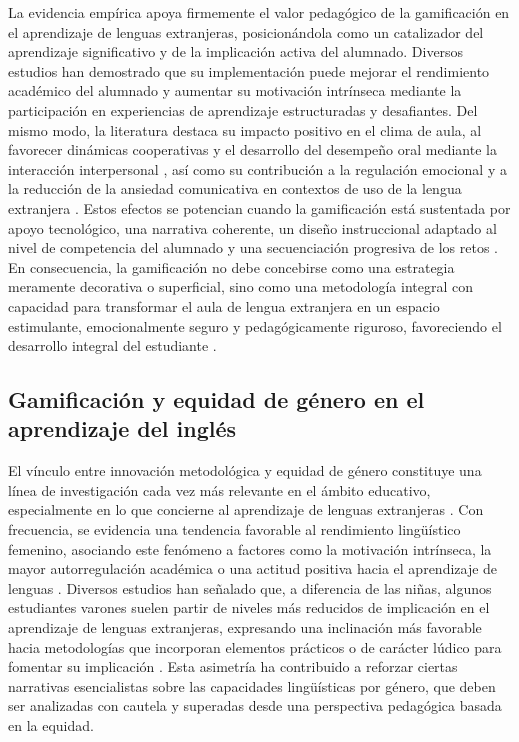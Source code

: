\documentclass[spanish]{textolivre}
\begin{document}
La evidencia empírica apoya firmemente el valor pedagógico de la gamificación en el aprendizaje de lenguas extranjeras, posicionándola como un catalizador del aprendizaje significativo y de la implicación activa del alumnado. Diversos estudios han demostrado que su implementación puede mejorar el rendimiento académico del alumnado \cite{sanchez2019, fiestas2023} y aumentar su motivación intrínseca \cite{lampropoulos2022} mediante la participación en experiencias de aprendizaje estructuradas y desafiantes. Del mismo modo, la literatura destaca su impacto positivo en el clima de aula, al favorecer dinámicas cooperativas y el desarrollo del desempeño oral mediante la interacción interpersonal \cite{wong2021}, así como su contribución a la regulación emocional y a la reducción de la ansiedad comunicativa en contextos de uso de la lengua extranjera \cite{mora2020}. Estos efectos se potencian cuando la gamificación está sustentada por apoyo tecnológico, una narrativa coherente, un diseño instruccional adaptado al nivel de competencia del alumnado y una secuenciación progresiva de los retos \cite{quintero2018}. En consecuencia, la gamificación no debe concebirse como una estrategia meramente decorativa o superficial, sino como una metodología integral con capacidad para transformar el aula de lengua extranjera en un espacio estimulante, emocionalmente seguro y pedagógicamente riguroso, favoreciendo el desarrollo integral del estudiante \cite{garcia2021}.

\subsection{Gamificación y equidad de género en el aprendizaje del inglés}
El vínculo entre innovación metodológica y equidad de género constituye una línea de investigación cada vez más relevante en el ámbito educativo, especialmente en lo que concierne al aprendizaje de lenguas extranjeras \cite{garciacalvo2022, nieto2019, nieto-casanova2026}. Con frecuencia, se evidencia una tendencia favorable al rendimiento lingüístico femenino, asociando este fenómeno a factores como la motivación intrínseca, la mayor autorregulación académica o una actitud positiva hacia el aprendizaje de lenguas \cite{porvoyer2014, barrios2015}. Diversos estudios han señalado que, a diferencia de las niñas, algunos estudiantes varones suelen partir de niveles más reducidos de implicación en el aprendizaje de lenguas extranjeras, expresando una inclinación más favorable hacia metodologías que incorporan elementos prácticos o de carácter lúdico para fomentar su implicación \cite{fernandez2014, lee2017}. Esta asimetría ha contribuido a reforzar ciertas narrativas esencialistas sobre las capacidades lingüísticas por género, que deben ser analizadas con cautela y superadas desde una perspectiva pedagógica basada en la equidad.
\end{document}
